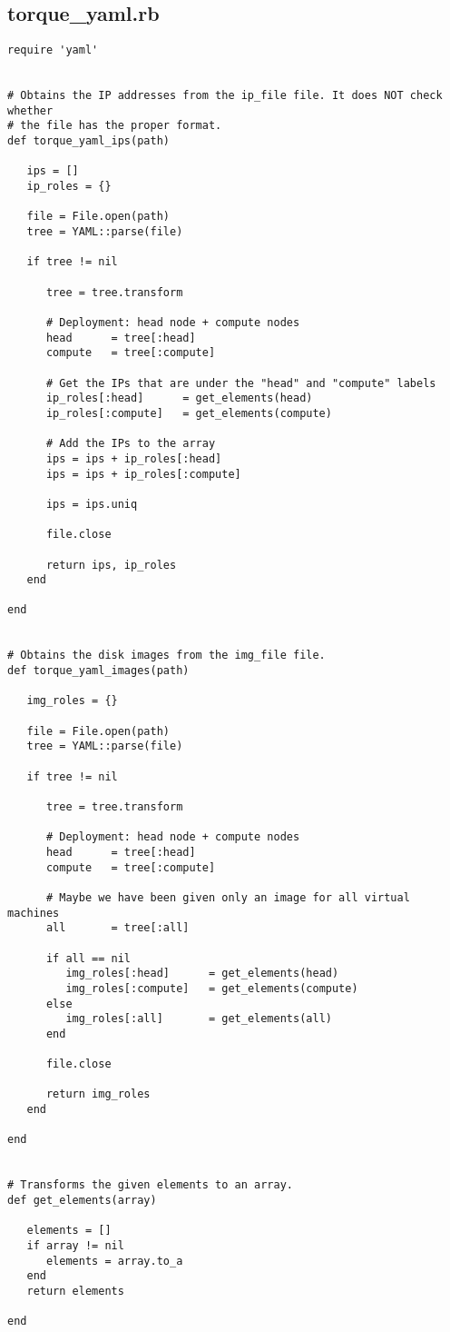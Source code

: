 \subsection{torque\_yaml.rb}


\begin{lstlisting}
require 'yaml'


# Obtains the IP addresses from the ip_file file. It does NOT check whether
# the file has the proper format.
def torque_yaml_ips(path)

   ips = []
   ip_roles = {}

   file = File.open(path)
   tree = YAML::parse(file)
   
   if tree != nil

      tree = tree.transform

      # Deployment: head node + compute nodes
      head      = tree[:head]
      compute   = tree[:compute]
      
      # Get the IPs that are under the "head" and "compute" labels
      ip_roles[:head]      = get_elements(head)
      ip_roles[:compute]   = get_elements(compute)
      
      # Add the IPs to the array
      ips = ips + ip_roles[:head]
      ips = ips + ip_roles[:compute]
      
      ips = ips.uniq
      
      file.close
      
      return ips, ip_roles
   end
   
end


# Obtains the disk images from the img_file file.
def torque_yaml_images(path)

   img_roles = {}

   file = File.open(path)
   tree = YAML::parse(file)
   
   if tree != nil

      tree = tree.transform

      # Deployment: head node + compute nodes
      head      = tree[:head]
      compute   = tree[:compute]
      
      # Maybe we have been given only an image for all virtual machines
      all       = tree[:all]
      
      if all == nil
         img_roles[:head]      = get_elements(head)
         img_roles[:compute]   = get_elements(compute)
      else
         img_roles[:all]       = get_elements(all)
      end
      
      file.close
      
      return img_roles
   end
   
end


# Transforms the given elements to an array.
def get_elements(array)

   elements = []
   if array != nil
      elements = array.to_a
   end
   return elements

end
\end{lstlisting}


